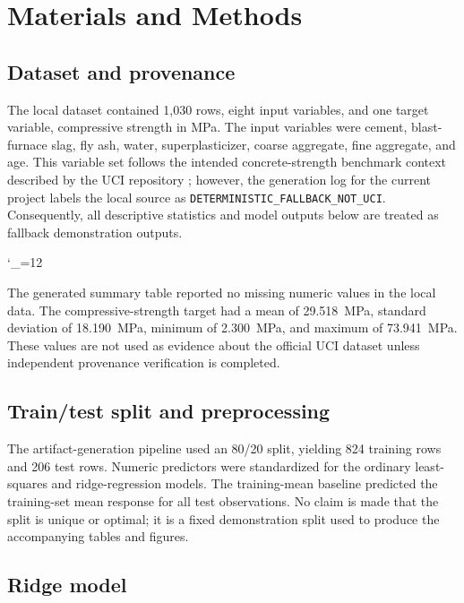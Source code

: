 \section{Materials and Methods}
\label{sec:methods}

\subsection{Dataset and provenance}
\label{sec:dataset}

The local dataset contained 1,030 rows, eight input variables, and one target variable, compressive strength in MPa. The input variables were cement, blast-furnace slag, fly ash, water, superplasticizer, coarse aggregate, fine aggregate, and age. This variable set follows the intended concrete-strength benchmark context described by the UCI repository \citep{Yeh1998_UCIConcreteDataset}; however, the generation log for the current project labels the local source as \texttt{DETERMINISTIC\_FALLBACK\_NOT\_UCI}. Consequently, all descriptive statistics and model outputs below are treated as fallback demonstration outputs.

\begingroup
\catcode`\_=12

\endgroup

The generated summary table reported no missing numeric values in the local data. The compressive-strength target had a mean of 29.518~MPa, standard deviation of 18.190~MPa, minimum of 2.300~MPa, and maximum of 73.941~MPa. These values are not used as evidence about the official UCI dataset unless independent provenance verification is completed.

\subsection{Train/test split and preprocessing}
\label{sec:split_preprocessing}

The artifact-generation pipeline used an 80/20 split, yielding 824 training rows and 206 test rows. Numeric predictors were standardized for the ordinary least-squares and ridge-regression models. The training-mean baseline predicted the training-set mean response for all test observations. No claim is made that the split is unique or optimal; it is a fixed demonstration split used to produce the accompanying tables and figures.

\subsection{Ridge model}
\label{sec:ridge_model}

